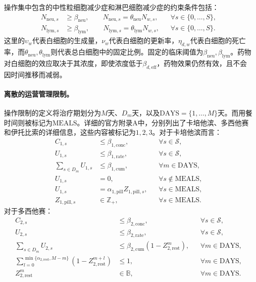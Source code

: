 \documentclass{article}
\begin{document}
操作集中包含的中性粒细胞减少症和淋巴细胞减少症的约束条件包括：
\begin{align*}
N_{\mathrm{neu},s}&\geq\beta_{\mathrm{neu}},\qquad
N_{\mathrm{neu},s}=\theta_{\mathrm{neu}}N_{w,s},
&&\forall s\in\{0,\ldots,S\},\\
N_{\mathrm{lym},s}&\geq\beta_{\mathrm{lym}},\qquad
N_{\mathrm{lym},s}=\theta_{\mathrm{lym}}N_{w,s},
&&\forall s\in\{0,\ldots,S\}.
\end{align*}
这里的$\upsilon_w$代表白细胞的生成量，$\nu_w$代表白细胞的更新率，$\eta_{d,w}$代表白细胞的死亡率，而$\theta_{\mathrm{neu}},\theta_{\mathrm{lym}}$则代表总白细胞中的固定比例。固定的临床阈值为$\beta_{\mathrm{neu}},\beta_{\mathrm{lym}}$。药物对白细胞的效应取决于其浓度，即使浓度低于$\beta_{d,\mathrm{eff}}$，药物效果仍然有效，且不会因时间推移而减弱。

\paragraph{离散的运营管理限制。}
操作限制的定义将治疗期划分为$M$天、$D_m$天，以及$\mathrm{DAYS}=\{1,\ldots,M\}$天。而用餐时间则被标记为$\mathrm{MEALS}$。详细的官方附录A中，分别列出了卡培他滨、多西他赛和伊托比索的详细信息，这些内容被标记为$1,2,3$。对于卡培他滨而言：
\begin{align*}
C_{1,s}&\leq\beta_{1,\mathrm{conc}}, &&\forall s\in\mathcal S,\\
U_{1,s}&\leq\beta_{1,\mathrm{rate}}, &&\forall s\in\mathcal S,\\
\sum_{s\in D_m}U_{1,s}&\leq\beta_{1,\mathrm{cum}}, &&\forall m\in\mathrm{DAYS},\\
U_{1,s}&=0, &&\forall s\notin\mathrm{MEALS},\\
U_{1,s}&=\alpha_{1,\mathrm{pill}}Z_{1,\mathrm{pill},s}, &&\forall s\in\mathrm{MEALS},\\
Z_{1,\mathrm{pill},s}&\in\mathbb Z_+, &&\forall s\in\mathrm{MEALS}.
\end{align*}
对于多西他赛：
\begin{align*}
C_{2,s}&\leq\beta_{2,\mathrm{conc}}, &&\forall s\in\mathcal S,\\
U_{2,s}&\leq\beta_{2,\mathrm{rate}}, &&\forall s\in\mathcal S,\\
\sum_{s\in D_m}U_{2,s}&\leq\beta_{2,\mathrm{cum}}(1-Z_{2,\mathrm{rest}}^m), &&\forall m\in\mathrm{DAYS},\\
\sum_{l=0}^{\min\{\alpha_{2,\mathrm{rest}},M-m\}}(1-Z_{2,\mathrm{rest}}^{m+l})&\leq1, &&\forall m\in\mathrm{DAYS},\\
Z_{2,\mathrm{rest}}^m&\in\mathbb B, &&\forall m\in\mathrm{DAYS}.
\end{align*}
\end{document}
